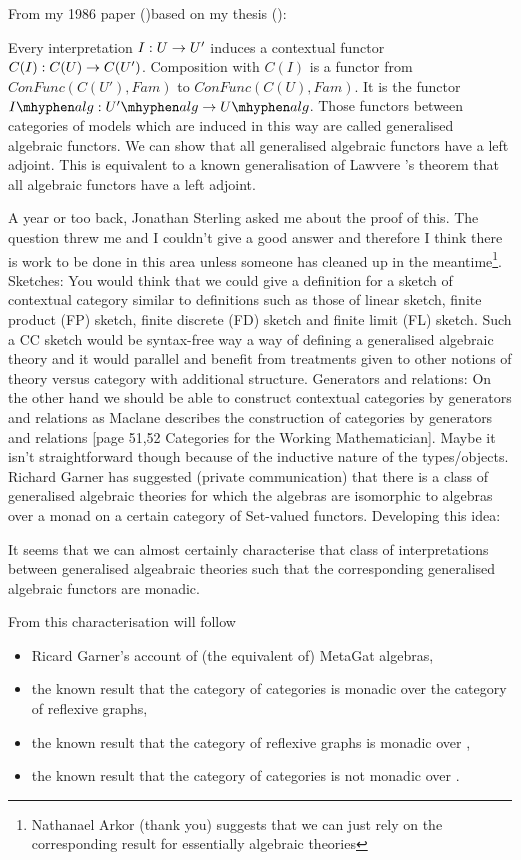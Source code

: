 \mynote From my 1986 paper (\cite{Cartmell86})based on my thesis (\cite{Cartmell78}):
\begin{tightquote}
Every interpretation $I:U \rightarrow U'$ induces a contextual functor 
$C(I):C(U) \rightarrow C(U')$. Composition with $C(I)$ is a functor from 
$ConFunc(C(U'),Fam)$ to
$ConFunc(C(U),Fam)$. It is the functor $\Ialg:\Upalg \morph \Ualg$. Those functors
between categories of models which are induced in this way are called generalised
algebraic functors. We can show that all generalised algebraic functors have a left adjoint.
This is
equivalent to a known generalisation of Lawvere \cite{LawvereAlgebraicTheories}'s theorem that all algebraic
functors have a left adjoint. 
\end{tightquote}
A year or too back, Jonathan Sterling asked me about the proof of this. The question threw me and I couldn't give a good answer and therefore I think there is work to be done in this area unless someone has cleaned up in the meantime\footnote{Nathanael Arkor (thank you) suggests that we can just rely on the corresponding result for essentially algebraic theories}.
\mynote
Sketches: You would think that we could give a definition for a sketch of contextual category 
similar to  definitions such as those of linear sketch, finite product (FP) sketch, finite discrete (FD) sketch and finite limit (FL) sketch. Such a CC sketch would be syntax-free way a way of defining a generalised algebraic theory and it would parallel and benefit from treatments given to other notions of theory versus category with additional structure. 
\mynote
Generators and relations: On the other hand we should be able to construct contextual categories by generators and  
relations as Maclane describes the construction of categories by generators and relations
[page 51,52 Categories for the Working Mathematician]. Maybe it isn't  straightforward  though because of the inductive nature of the types/objects. 
\mynote Richard Garner has suggested (private communication) that there is a class of generalised algebraic theories for which the algebras are isomorphic to algebras  over a monad on a certain category of Set-valued functors. Developing this idea: 

\noindent
It seems that we can almost certainly characterise that class of interpretations between 
generalised algeabraic theories such that the corresponding generalised algebraic functors are monadic.

From this characterisation will follow 
\begin{itemize}
\item Ricard Garner's account of (the equivalent of) MetaGat algebras,
\item  the known result that the category of categories is monadic over the category of reflexive graphs, 
\item the known result that the category of reflexive graphs is monadic over ,
\item the known result that the category of categories is not monadic over .
\end{itemize}

